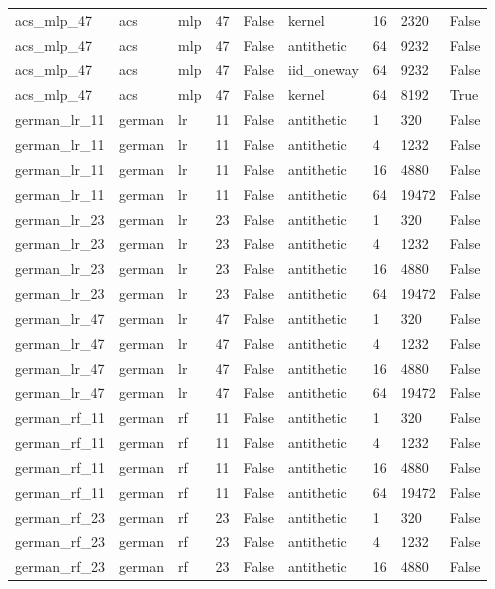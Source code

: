 \begin{tabular}{lllllllll}
acs\_mlp\_47 & acs & mlp & 47 & False & kernel & 16 & 2320 & False \\
acs\_mlp\_47 & acs & mlp & 47 & False & antithetic & 64 & 9232 & False \\
acs\_mlp\_47 & acs & mlp & 47 & False & iid\_oneway & 64 & 9232 & False \\
acs\_mlp\_47 & acs & mlp & 47 & False & kernel & 64 & 8192 & True \\
german\_lr\_11 & german & lr & 11 & False & antithetic & 1 & 320 & False \\
german\_lr\_11 & german & lr & 11 & False & antithetic & 4 & 1232 & False \\
german\_lr\_11 & german & lr & 11 & False & antithetic & 16 & 4880 & False \\
german\_lr\_11 & german & lr & 11 & False & antithetic & 64 & 19472 & False \\
german\_lr\_23 & german & lr & 23 & False & antithetic & 1 & 320 & False \\
german\_lr\_23 & german & lr & 23 & False & antithetic & 4 & 1232 & False \\
german\_lr\_23 & german & lr & 23 & False & antithetic & 16 & 4880 & False \\
german\_lr\_23 & german & lr & 23 & False & antithetic & 64 & 19472 & False \\
german\_lr\_47 & german & lr & 47 & False & antithetic & 1 & 320 & False \\
german\_lr\_47 & german & lr & 47 & False & antithetic & 4 & 1232 & False \\
german\_lr\_47 & german & lr & 47 & False & antithetic & 16 & 4880 & False \\
german\_lr\_47 & german & lr & 47 & False & antithetic & 64 & 19472 & False \\
german\_rf\_11 & german & rf & 11 & False & antithetic & 1 & 320 & False \\
german\_rf\_11 & german & rf & 11 & False & antithetic & 4 & 1232 & False \\
german\_rf\_11 & german & rf & 11 & False & antithetic & 16 & 4880 & False \\
german\_rf\_11 & german & rf & 11 & False & antithetic & 64 & 19472 & False \\
german\_rf\_23 & german & rf & 23 & False & antithetic & 1 & 320 & False \\
german\_rf\_23 & german & rf & 23 & False & antithetic & 4 & 1232 & False \\
german\_rf\_23 & german & rf & 23 & False & antithetic & 16 & 4880 & False \\

\end{tabular}
